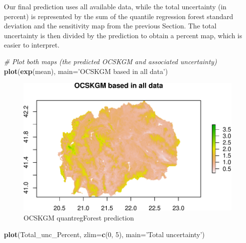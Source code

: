 \documentclass[10pt,b5paper,]{book}
\newenvironment{Shaded}{\begin{snugshade}}{\end{snugshade}}
\newcommand{\CommentTok}[1]{\textcolor[rgb]{0.56,0.35,0.01}{\textit{#1}}}
\newcommand{\DataTypeTok}[1]{\textcolor[rgb]{0.13,0.29,0.53}{#1}}
\newcommand{\DecValTok}[1]{\textcolor[rgb]{0.00,0.00,0.81}{#1}}
\newcommand{\KeywordTok}[1]{\textcolor[rgb]{0.13,0.29,0.53}{\textbf{#1}}}
\newcommand{\NormalTok}[1]{#1}
\newcommand{\StringTok}[1]{\textcolor[rgb]{0.31,0.60,0.02}{#1}}
\theoremstyle{definition}
\theoremstyle{definition}
\theoremstyle{definition}
\theoremstyle{remark}
\begin{document}
Our final prediction uses all available data, while the total
uncertainty (in percent) is represented by the sum of the quantile
regression forest standard deviation and the sensitivity map from the
previous Section. The total uncertainty is then divided by the
prediction to obtain a percent map, which is easier to interpret.

\begin{Shaded}
\begin{Highlighting}[]
\CommentTok{# Plot both maps (the predicted OCSKGM and associated uncertainty)}
\KeywordTok{plot}\NormalTok{(}\KeywordTok{exp}\NormalTok{(mean), }\DataTypeTok{main=}\StringTok{'OCSKGM based in all data'}\NormalTok{)}
\end{Highlighting}
\end{Shaded}

\begin{figure}
\centering
\includegraphics{SOCMapping_files/figure-latex/unnamed-chunk-65-1.pdf}
\caption{\label{fig:unnamed-chunk-65}OCSKGM quantregForest prediction}
\end{figure}

\begin{Shaded}
\begin{Highlighting}[]
\KeywordTok{plot}\NormalTok{(Total_unc_Percent, }\DataTypeTok{zlim=}\KeywordTok{c}\NormalTok{(}\DecValTok{0}\NormalTok{, }\DecValTok{5}\NormalTok{), }\DataTypeTok{main=}\StringTok{'Total uncertainty'}\NormalTok{)}
\end{Highlighting}
\end{Shaded}
\end{document}
